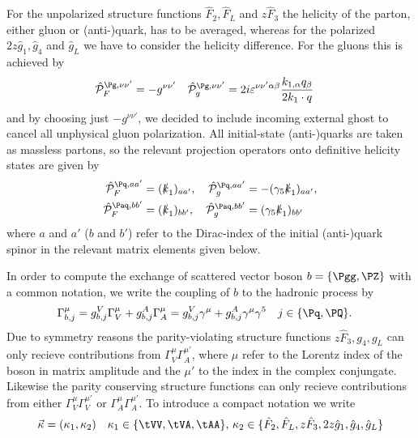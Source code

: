 For the unpolarized structure functions $\hat F_2,\hat F_L$ and $z\hat F_3$ the helicity of the parton, either gluon or (anti-)quark, has to be averaged, whereas for the polarized $2z\hat g_1,\hat g_4$ and $\hat g_L$ we have to consider the helicity difference. For the gluons this is achieved by
\begin{align}
\hat{\mathcal P}_{F}^{\Pg,\nu\nu'} &= - g^{\nu\nu'}
&\hat{\mathcal P}_{g}^{\Pg,\nu\nu'} &= 2i\varepsilon^{\nu\nu'\alpha\beta} \frac{k_{1,\alpha}q_\beta}{2k_1\cdot q}
\end{align}
and by choosing just $- g^{\nu\nu'}$, we decided to include incoming external ghost to cancel all unphysical gluon polarization. All initial-state (anti-)quarks are taken as massless partons, so the relevant projection operators onto definitive helicity states are given by
\begin{align}
\hat{\mathcal P}_{F}^{\Pq,aa'} &= (\slashed k_1)_{aa'},
&\hat{\mathcal P}_{g}^{\Pq,aa'} &= -(\gamma_5\slashed k_1)_{aa'},\nonumber\\
\hat{\mathcal P}_{F}^{\Paq,bb'} &= (\slashed k_1)_{bb'},
&\hat{\mathcal P}_{g}^{\Paq,bb'} &= (\gamma_5\slashed k_1)_{bb'}
\end{align}
where $a$ and $a'$ ($b$ and $b'$) refer to the Dirac-index of the initial (anti-)quark spinor in the relevant matrix elements given below.

In order to compute the exchange of scattered vector boson $b=\{\Pgg,\PZ\}$ with a common notation, we write the coupling of $b$ to the hadronic process by
\begin{align}
\Gamma^\mu_{b,j} &= g^V_{b,j} \Gamma^\mu_{V} + g^A_{b,j} \Gamma^\mu_{A} = g^V_{b,j} \gamma^\mu + g^A_{b,j} \gamma^\mu\gamma^5 \quad j\in\{\Pq,\PQ\}.
\end{align}
Due to symmetry reasons the parity-violating structure functions $z\hat F_3,g_4,g_L$ can only recieve contributions from $\Gamma^\mu_V\Gamma^{\mu'}_A$, where $\mu$  refer to the Lorentz index of the boson in matrix amplitude and the $\mu'$ to the index in the complex conjungate. Likewise the parity conserving structure functions can only recieve contributions from either $\Gamma^\mu_V\Gamma^{\mu'}_V$ or $\Gamma^\mu_A\Gamma^{\mu'}_A$. To introduce a compact notation we write
\begin{align}
\vec \kappa =(\kappa_1,\kappa_2)\quad\kappa_1\in\{\tVV,\tVA,\tAA\},\,\kappa_2\in\{\hat F_2,\hat F_L,z\hat F_3,2z\hat g_1,\hat g_4,\hat g_L\}
\end{align}
